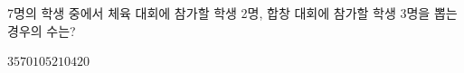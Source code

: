 7명의 학생 중에서 체육 대회에 참가할 학생 2명, 합창 대회에 참가할 학생 3명을 뽑는 경우의 수는? 
\begin{choices32}{$35$}{$70$}{$105$}{$210$}{$420$}\end{choices32}
